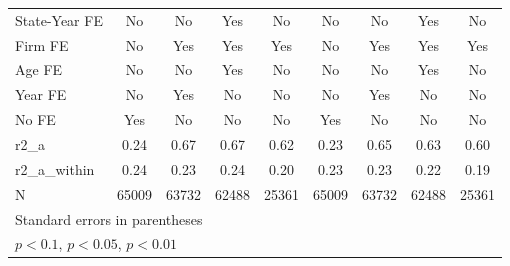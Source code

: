 {\begin{tabular}{l*{8}{c}}
\addlinespace
State-Year FE       &          No         &          No         &         Yes         &          No         &          No         &          No         &         Yes         &          No         \\
\addlinespace
Firm FE             &          No         &         Yes         &         Yes         &         Yes         &          No         &         Yes         &         Yes         &         Yes         \\
\addlinespace
Age FE              &          No         &          No         &         Yes         &          No         &          No         &          No         &         Yes         &          No         \\
\addlinespace
Year FE             &          No         &         Yes         &          No         &          No         &          No         &         Yes         &          No         &          No         \\
\addlinespace
No FE               &         Yes         &          No         &          No         &          No         &         Yes         &          No         &          No         &          No         \\
\midrule
r2\_a                &        0.24         &        0.67         &        0.67         &        0.62         &        0.23         &        0.65         &        0.63         &        0.60         \\
r2\_a\_within         &        0.24         &        0.23         &        0.24         &        0.20         &        0.23         &        0.23         &        0.22         &        0.19         \\
N                   &       65009         &       63732         &       62488         &       25361         &       65009         &       63732         &       62488         &       25361         \\
\bottomrule
\multicolumn{9}{l}{\footnotesize Standard errors in parentheses}\\
\multicolumn{9}{l}{\footnotesize \sym{*} \(p<0.1\), \sym{**} \(p<0.05\), \sym{***} \(p<0.01\)}\\
\end{tabular}
}
